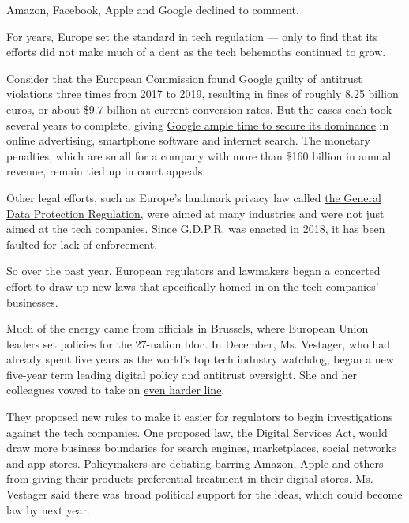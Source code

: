 Amazon, Facebook, Apple and Google declined to comment.

For years, Europe set the standard in tech regulation --- only to find
that its efforts did not make much of a dent as the tech behemoths
continued to grow.

Consider that the European Commission found Google guilty of antitrust
violations three times from 2017 to 2019, resulting in fines of roughly
8.25 billion euros, or about \$9.7 billion at current conversion rates.
But the cases each took several years to complete, giving
\href{https://www.nytimes3xbfgragh.onion/2019/11/11/business/europe-technology-antitrust-regulation.html}{Google
ample time to secure its dominance} in online advertising, smartphone
software and internet search. The monetary penalties, which are small
for a company with more than \$160 billion in annual revenue, remain
tied up in court appeals.

Other legal efforts, such as Europe's landmark privacy law called
\href{https://www.nytimes3xbfgragh.onion/2018/05/24/technology/europe-gdpr-privacy.html}{the
General Data Protection Regulation}, were aimed at many industries and
were not just aimed at the tech companies. Since G.D.P.R. was enacted in
2018, it has been
\href{https://www.nytimes3xbfgragh.onion/2020/04/27/technology/GDPR-privacy-law-europe.html}{faulted
for lack of enforcement}.

So over the past year, European regulators and lawmakers began a
concerted effort to draw up new laws that specifically homed in on the
tech companies' businesses.

Much of the energy came from officials in Brussels, where European Union
leaders set policies for the 27-nation bloc. In December, Ms. Vestager,
who had already spent five years as the world's top tech industry
watchdog, began a new five-year term leading digital policy and
antitrust oversight. She and her colleagues vowed to take an
\href{https://www.google.com/search?q=nytimes+vestager+satariano\&oq=nytimes+vestager+satariano\&aqs=chrome..69i57j69i64j69i61.5096j0j7\&sourceid=chrome\&ie=UTF-8}{even
harder line}.

They proposed new rules to make it easier for regulators to begin
investigations against the tech companies. One proposed law, the Digital
Services Act, would draw more business boundaries for search engines,
marketplaces, social networks and app stores. Policymakers are debating
barring Amazon, Apple and others from giving their products preferential
treatment in their digital stores. Ms. Vestager said there was broad
political support for the ideas, which could become law by next year.

